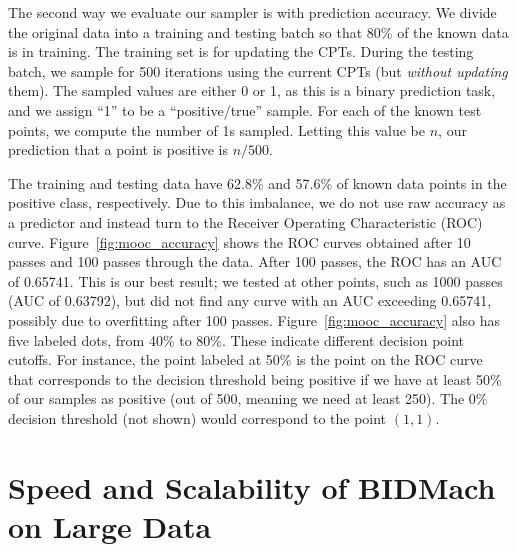 \documentclass{article} %
\begin{document}
The second way we evaluate our sampler is with prediction accuracy. We divide the original
data into a training and testing batch so that 80\% of the known data is in training. The training
set is for updating the CPTs. During the testing batch, we sample for 500 iterations using the
current CPTs (but \emph{without updating} them). The sampled values are either 0 or 1, as this is a
binary prediction task, and we assign ``1'' to be a ``positive/true'' sample. For each of the known
test points, we compute the number of 1s sampled. Letting this value be $n$, our prediction that a
point is positive is $n/500$.

The training and testing data have 62.8\% and 57.6\% of known data points in the positive class,
respectively. Due to this imbalance, we do not use raw accuracy as a predictor and instead turn to
the Receiver Operating Characteristic (ROC) curve. Figure~\ref{fig:mooc_accuracy} shows the ROC
curves obtained after 10 passes and 100 passes through the data. After 100 passes, the ROC has an
AUC of 0.65741. This is our best result; we tested at other points, such as 1000 passes (AUC of
0.63792), but did not find any curve with an AUC exceeding 0.65741, possibly due to overfitting
after 100 passes. Figure~\ref{fig:mooc_accuracy} also has five labeled dots, from 40\% to 80\%.
These indicate different decision point cutoffs. For instance, the point labeled at 50\% is the
point on the ROC curve that corresponds to the decision threshold being positive if we have at least
50\% of our samples as positive (out of 500, meaning we need at least 250). The 0\% decision
threshold (not shown) would correspond to the point $(1,1)$.



\section{Speed and Scalability of BIDMach on Large Data}\label{sec:scaling_large_data}
\end{document}
